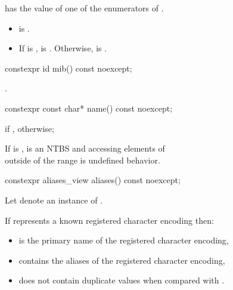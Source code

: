 \documentclass{wg21}
\begin{document}
\begin{addedblock}
\begin{itemdescr}
    \preconditions
     has the value of one of the enumerators of .

    \postcondition
    \begin{itemize}
       \item  {} is .
       \item  If  is ,  is . Otherwise,
        is .
    \end{itemize}
\end{itemdescr}


\begin{itemdecl}
constexpr id mib() const noexcept;
\end{itemdecl}

\begin{itemdescr}
\returns {}.

\end{itemdescr}

\begin{itemdecl}
constexpr const char* name() const noexcept;
\end{itemdecl}
\begin{itemdescr}
\returns {} if ,  otherwise;

\remarks
If  is ,  is an NTBS and accessing elements of\\
 outside of the range \tcode{name() + [0, strlen() + 1)} is undefined behavior.
\end{itemdescr}

\begin{itemdecl}
constexpr aliases_view aliases() const noexcept;
\end{itemdecl}


\begin{itemdescr}

Let  denote an instance of .

\pnum If  represents a known registered character encoding then:
\begin{itemize}
    \item {} is the  primary name of the registered character encoding,
    \item {} contains the aliases of the registered character encoding,
    \item {} does not contain duplicate values when compared with .
\end{itemize}


\end{itemdescr}
\end{addedblock}
\end{document}
